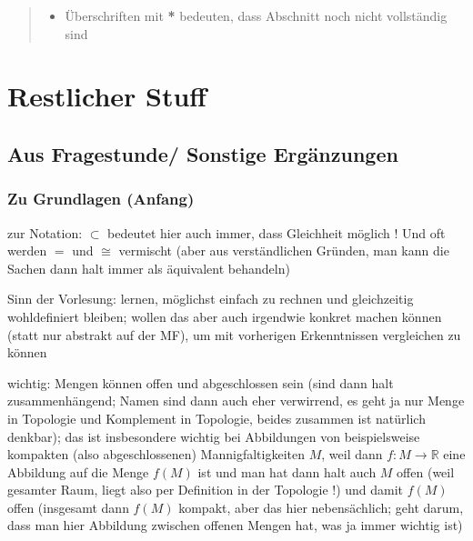 \begin{abstract}
\begin{itemize}
\item Überschriften mit \textbf{*} bedeuten, dass Abschnitt noch nicht vollständig sind
\end{itemize}
\end{abstract}


\newpage



\tableofcontents

\newpage

\listoffigures

\newpage



\pagestyle{scrheadings}



















\chapter{Restlicher Stuff}


	\section{Aus Fragestunde/ Sonstige Ergänzungen}
		\subsection*{Zu Grundlagen (Anfang)}
zur Notation: $\subset$ bedeutet hier auch immer, dass Gleichheit möglich ! Und oft werden $=$ und $\cong$ vermischt (aber aus verständlichen Gründen, man kann die Sachen dann halt immer als äquivalent behandeln)

Sinn der Vorlesung: lernen, möglichst einfach zu rechnen und gleichzeitig wohldefiniert bleiben; wollen das aber auch irgendwie konkret machen können (statt nur abstrakt auf der MF), um mit vorherigen Erkenntnissen vergleichen zu können


wichtig: Mengen können offen und abgeschlossen sein (sind dann halt zusammenhängend; Namen sind dann auch eher verwirrend, es geht ja nur Menge in Topologie und Komplement in Topologie, beides zusammen ist natürlich denkbar); das ist insbesondere wichtig bei Abbildungen von beispielsweise kompakten (also abgeschlossenen) Mannigfaltigkeiten $M$, weil dann $f: M \rightarrow \mathbb{R}$ eine Abbildung auf die Menge $f(M)$ ist und man hat dann halt auch $M$ offen (weil gesamter Raum, liegt also per Definition in der Topologie !) und damit $f(M)$ offen (insgesamt dann $f(M)$ kompakt, aber das hier nebensächlich; geht darum, dass man hier Abbildung zwischen offenen Mengen hat, was ja immer wichtig ist)


